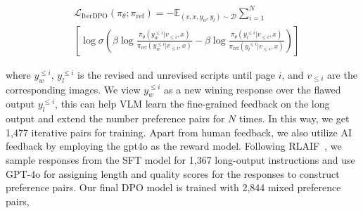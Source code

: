 \begin{small} 
\begin{equation}
\begin{aligned}
&\mathcal{L}_\text{IterDPO}(\pi_\theta; \pi_\text{ref})= -\mathbb{E}_{(v,x, y_w, y_l)\sim\mathcal{D}} \sum_{i=1}^{N}\\
&[\log\sigma(\beta\log\frac{\pi_\theta(y_w^{\le i}|v_{\le i},x)}{\pi_\text{ref}(y_w^{\le i}|v_{\le i},x)}-\beta\log\frac{\pi_\theta(y_l^{\le i}|v_{\le i},x)}{\pi_\text{ref}(y_l^{\le i}|v_{\le i},x)})]
\end{aligned}
\end{equation}
\end{small}
where $y_w^{\le i}$,  $y_l^{\le i}$ is the revised and unrevised scripts until page $i$, and $v_{\le i}$ are the corresponding images. We view $y_w^{\le i}$ as a new wining response over the flawed output $y_l^{\le i}$, this can help VLM learn the fine-grained feedback on the long output and extend the number preference pairs for $N$ times. In this way, we get 1,477 iterative pairs for training. Apart from human feedback, we also utilize AI feedback by employing the gpt4o as the reward model. Following RLAIF~\cite{yu2024rlaif}, we sample responses from the SFT model for 1,367 long-output instructions and use GPT-4o for assigning length and quality scores for the responses to construct preference pairs. Our final DPO model is trained with 2,844 mixed preference pairs,


